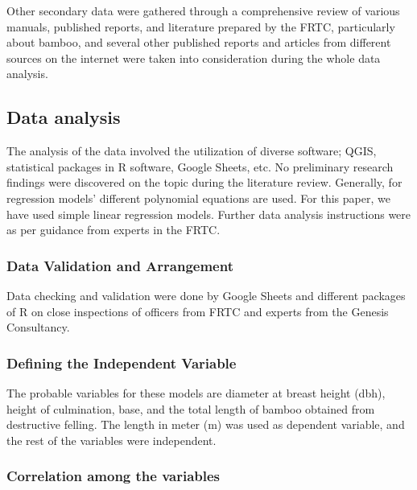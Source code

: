 \documentclass[preprint, 3p,
authoryear]{elsarticle} %
\begin{document}
Other secondary data were gathered through a comprehensive review of
various manuals, published reports, and literature prepared by the FRTC,
particularly about bamboo, and several other published reports and
articles from different sources on the internet were taken into
consideration during the whole data analysis.

\hypertarget{data-analysis}{%
\subsection{Data analysis}\label{data-analysis}}

The analysis of the data involved the utilization of diverse software;
QGIS, statistical packages in R software, Google Sheets, etc. No
preliminary research findings were discovered on the topic during the
literature review. Generally, for regression models' different
polynomial equations are used. For this paper, we have used simple
linear regression models. Further data analysis instructions were as per
guidance from experts in the FRTC.

\hypertarget{data-validation-and-arrangement}{%
\subsubsection{Data Validation and
Arrangement}\label{data-validation-and-arrangement}}

Data checking and validation were done by Google Sheets and different
packages of R on close inspections of officers from FRTC and experts
from the Genesis Consultancy.

\hypertarget{defining-the-independent-variable}{%
\subsubsection{Defining the Independent
Variable}\label{defining-the-independent-variable}}

The probable variables for these models are diameter at breast height
(dbh), height of culmination, base, and the total length of bamboo
obtained from destructive felling. The length in meter (m) was used as
dependent variable, and the rest of the variables were independent.

\hypertarget{correlation-among-the-variables}{%
\subsubsection{Correlation among the
variables}\label{correlation-among-the-variables}}
\end{document}
